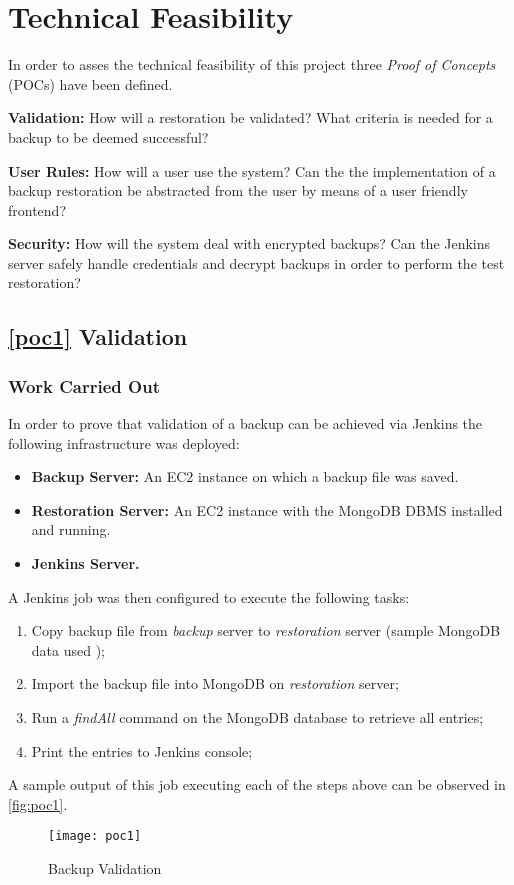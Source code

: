 
\section{Technical Feasibility}
In order to asses the technical feasibility of this project three \textit{Proof of Concepts} (POCs) have been defined.

\begin{POC}
	\item \label{poc1} \textbf{Validation:} How will a restoration be validated? What criteria is needed for a backup to be deemed successful?
	\item \label{poc2} \textbf{User Rules:} How will a user use the system? Can the the implementation of a backup restoration be abstracted from the user by means of a user friendly frontend?
	\item \label{poc3} \textbf{Security:} How will the system deal with encrypted backups? Can the Jenkins server safely handle credentials and decrypt backups in order to perform the test restoration?
\end{POC}

	\subsection{\ref{poc1} Validation}
	\subsubsection{Work Carried Out}	
	In order to prove that validation of a backup can be achieved via Jenkins the following infrastructure was deployed:
	\begin{itemize}
		\item \textbf{Backup Server:} An EC2 instance on which a backup file was saved.
		\item \textbf{Restoration Server:} An EC2 instance with the MongoDB DBMS installed and running.
		\item \textbf{Jenkins Server.}
	\end{itemize}
	A Jenkins job was then configured to execute the following tasks:
	\begin{enumerate}
		\item Copy backup file from \textit{backup} server to \textit{restoration} server (sample MongoDB data used \citep{mongo});
		\item Import the backup file into MongoDB on \textit{restoration} server;
		\item Run a \textit{findAll} command on the MongoDB database to retrieve all entries;
		\item Print the entries to Jenkins console;
	\end{enumerate}
	A sample output of this job executing each of the steps above can be observed in \autoref{fig:poc1}.
	\begin{figure}[H]
		\caption{Backup Validation}
		\centering
		\texttt{[image: poc1]}
		\label{fig:poc1}
	\end{figure}
	
